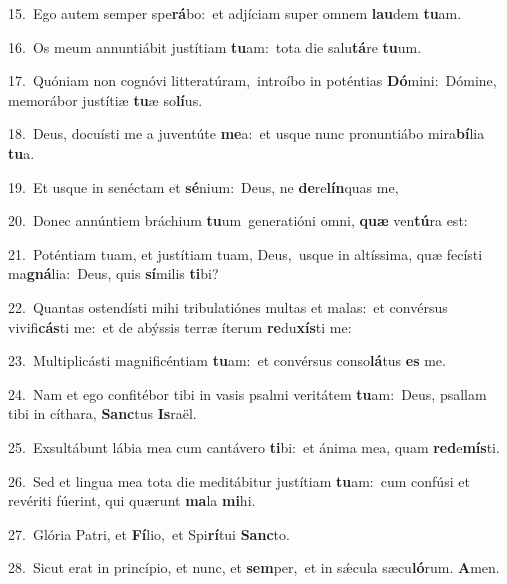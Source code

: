 {\numbfont\textcolor{\numbcolor}{15.}}~Ego autem semper spe\-\textbf{rá}\-bo:~\star et adjíciam super omnem \textbf{lau}\-dem \textbf{tu}\-am.\par
{\numbfont\textcolor{\numbcolor}{16.}}~Os meum annuntiábit justítiam \textbf{tu}\-am:~\star tota die salu\-\textbf{tá}\-re \textbf{tu}\-um.\par
{\numbfont\textcolor{\numbcolor}{17.}}~Quóniam non cognóvi litteratúram,~\dagger introíbo in poténtias \textbf{Dó}\-mini:~\star Dómine, memorábor justítiæ \textbf{tu}\-æ so\-\textbf{lí}\-us.\par
{\numbfont\textcolor{\numbcolor}{18.}}~Deus, docuísti me a juventúte \textbf{me}\-a:~\star et usque nunc pronuntiábo mira\-\textbf{bí}\-lia \textbf{tu}\-a.\par
{\numbfont\textcolor{\numbcolor}{19.}}~Et usque in senéctam et \textbf{sé}\-nium:~\star Deus, ne \textbf{de}\-re\-\textbf{lín}\-quas me,\par
{\numbfont\textcolor{\numbcolor}{20.}}~Donec annúntiem bráchium \textbf{tu}\-um~\star generatióni omni, \textbf{quæ} ven\-\textbf{tú}\-ra est:\par
{\numbfont\textcolor{\numbcolor}{21.}}~Poténtiam tuam, et justítiam tuam, Deus,~\dagger usque in altíssima, quæ fecísti ma\-\textbf{gná}\-lia:~\star Deus, quis \textbf{sí}\-milis \textbf{ti}\-bi?\par
{\numbfont\textcolor{\numbcolor}{22.}}~Quantas ostendísti mihi tribulatiónes multas et malas:~\dagger et convérsus vivifi\-\textbf{cás}\-ti me:~\star et de abýssis terræ íterum \textbf{re}\-du\-\textbf{xís}\-ti me:\par
{\numbfont\textcolor{\numbcolor}{23.}}~Multiplicásti magnificéntiam \textbf{tu}\-am:~\star et convérsus conso\-\textbf{lá}\-tus \textbf{es} me.\par
{\numbfont\textcolor{\numbcolor}{24.}}~Nam et ego confitébor tibi in vasis psalmi veritátem \textbf{tu}\-am:~\star Deus, psallam tibi in cíthara, \textbf{Sanc}\-tus \textbf{Is}\-raël.\par
{\numbfont\textcolor{\numbcolor}{25.}}~Exsultábunt lábia mea cum cantávero \textbf{ti}\-bi:~\star et ánima mea, quam \textbf{red}\-e\-\textbf{mís}\-ti.\par
{\numbfont\textcolor{\numbcolor}{26.}}~Sed et lingua mea tota die meditábitur justítiam \textbf{tu}\-am:~\star cum confúsi et revériti fúerint, qui quærunt \textbf{ma}\-la \textbf{mi}\-hi.\par
{\numbfont\textcolor{\numbcolor}{27.}}~Glória Patri, et \textbf{Fí}\-lio,~\star et Spi\-\textbf{rí}\-tui \textbf{Sanc}\-to.\par
{\numbfont\textcolor{\numbcolor}{28.}}~Sicut erat in princípio, et nunc, et \textbf{sem}\-per,~\star et in sǽcula sæcu\-\textbf{ló}\-rum. \textbf{A}\-men.\par

